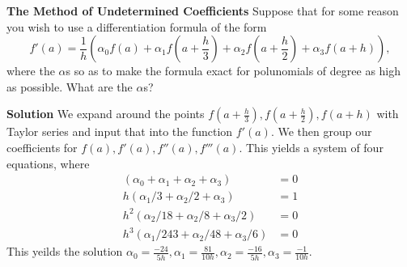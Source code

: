 \textbf{The Method of Undetermined Coefficients} Suppose that for some reason you wish to use a differentiation formula of the form
$$ f'(a) = \frac{1}{h}(\alpha_0f(a) + \alpha_1f(a + \frac{h}{3}) + \alpha_2f(a + \frac{h}{2}) + \alpha_3 f(a + h)),$$ where the $\alpha$s so as to make the formula exact for polunomials of degree as high as possible. What are the $\alpha$s?

\textbf{Solution}
We expand around the points $f(a + \frac{h}{3}), f(a + \frac{h}{2}), f(a + h)$ with Taylor series and input that into the function $f'(a)$. We then group our coefficients for $f(a), f'(a), f''(a), f'''(a)$. This yields a system of four equations, where 
\begin{align*}
(\alpha_0 + \alpha_1 + \alpha_2 + \alpha_3) &= 0 \\
h(\alpha_1/3 + \alpha_2 / 2 + \alpha_3) &= 1\\
h^2(\alpha_2/ 18 + \alpha_2 / 8 + \alpha_3/2) &= 0\\
h^3(\alpha_1/ 243 + \alpha_2 / 48 + \alpha_3 / 6) &= 0 
\end{align*}
This yeilds the solution $\alpha_0 = \frac{-24}{5h}, \alpha_1 = \frac{81}{10h}, \alpha_2 = \frac{-16}{5h}, \alpha_3 = \frac{-1}{10h}$. 